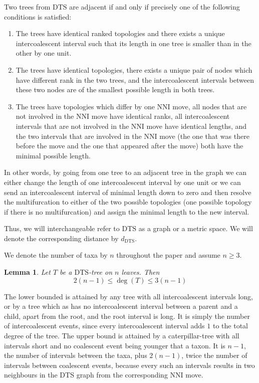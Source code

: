 \documentclass{amsart}
\newtheorem{lemma}{Lemma}
\newcommand{\dts}{\mathrm{DTS}}
\begin{document}
Two trees from $\dts$ are adjacent if and only if precisely one of the following
conditions is satisfied: 

\begin{enumerate}[(1)]
\item The trees have identical ranked topologies and there exists a unique
intercoalescent interval such that its length in one tree is smaller than in the
other by one unit. 
\item The trees have identical topologies, there exists a unique pair of nodes
which have different rank in the two trees, and the intercoalescent intervals 
between these two nodes are of the smallest possible length in both trees. 
\item The trees have topologies which differ by one NNI move, all nodes that
are not involved in the NNI move have identical ranks, all intercoalescent
intervals that are not involved in the NNI move have identical lengths, 
and the two intervals that are involved in the NNI move (the one that was there
before the move and the one that appeared after the move) both have the minimal
possible length.  
\end{enumerate}

In other words, by going from one tree to an adjacent tree in the graph we can
either change the length of one intercoalescent interval by one unit or we
can send an intercoalescent interval of minimal length down to zero and
then resolve the multifurcation to either of the two possible topologies
(one possible topology if there is no multifurcation) and
assign the minimal length to the new interval.

Thus, we will interchangeable refer to $\dts$ as a graph or a metric space. 
We will denote the corresponding distance by $d_\dts$. 

We denote the number of taxa by $n$ throughout the paper and assume $n \geq 3$.

\begin{lemma}
Let $T$ be a $\dts$-tree on $n$ leaves. Then \[2(n-1)\leq \deg(T)\leq3(n-1)\] 
\end{lemma}

\proof
The lower bounded is attained by any tree with all intercoalescent intervals 
long, or by a tree which as has no intercoalescent interval between a parent and
a child, apart from the root, and the root interval is long. It is simply the
number of intercoalescent events, since every intercoalescent interval adds $1$
to the total degree of the tree. The upper bound is attained by a 
caterpillar-tree with all intervals short and no coalescent event being younger
that a taxon. It is $n-1$, the number of intervals between the taxa, plus 
$2(n-1)$, twice the number of intervals between coalescent events, because 
every such an intervals results in two neighbours in the $\dts$ graph from
the corresponding NNI move. 
\endproof
\end{document}
